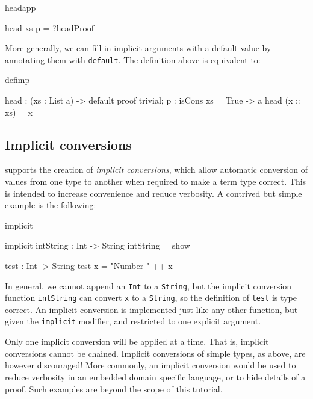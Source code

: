 \begin{SaveVerbatim}{headapp}

head xs {p = ?headProof} 

\end{SaveVerbatim}

\noindent
More generally, we can fill in implicit arguments with a default value by annotating
them with \texttt{default}. The definition above is equivalent to:

\begin{SaveVerbatim}{defimp}

head : (xs : List a) -> 
       {default proof { trivial; } p : isCons xs = True} -> a
head (x :: xs) = x

\end{SaveVerbatim}

\subsection{Implicit conversions}

\Idris{} supports the creation of \emph{implicit conversions}, which allow
automatic conversion of values from one type to another when required to make
a term type correct. This is intended to increase convenience and reduce
verbosity. A contrived but simple example is the following:

\begin{SaveVerbatim}{implicit}

implicit intString : Int -> String
intString = show
  
test : Int -> String
test x = "Number " ++ x

\end{SaveVerbatim}

\noindent
In general, we cannot append an \texttt{Int} to a \texttt{String}, but the
implicit conversion function \texttt{intString} can convert \texttt{x} to a
\texttt{String}, so the definition of \texttt{test} is type correct. An
implicit conversion is implemented just like any other function, but given
the \texttt{implicit} modifier, and restricted to one explicit argument.

Only one implicit conversion will be applied at a time. That is, implicit
conversions cannot be chained.
Implicit conversions of simple types, as above, are however discouraged! More
commonly, an implicit conversion would be used to reduce verbosity in an
embedded domain specific language, or to hide details of a proof. Such examples
are beyond the scope of this tutorial.

